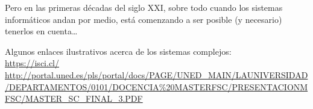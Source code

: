 \documentclass[10pt,a4paper]{article}
\begin{document}
Pero en las primeras décadas del siglo XXI, sobre todo cuando los sistemas informáticos andan por medio, está comenzando a ser posible (y necesario) tenerlos en cuenta\ldots

\hspace{1cm}

Algunos enlaces ilustrativos acerca de los sistemas complejos:
\\ \url{https://isci.cl/}
\hspace{0.1cm}
\\ \url{http://portal.uned.es/pls/portal/docs/PAGE/UNED_MAIN/LAUNIVERSIDAD/DEPARTAMENTOS/0101/DOCENCIA%20MASTERFSC/PRESENTACIONMFSC/MASTER_SC_FINAL_3.PDF}
\end{document}
